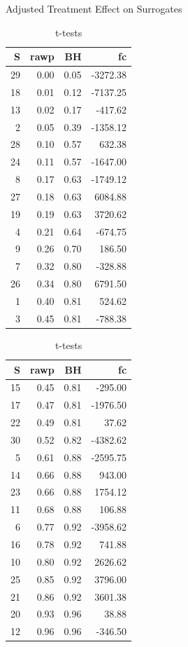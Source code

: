\documentclass[a4paper,9pt]{beamer}\usepackage[]{graphicx}\usepackage[]{color}
\begin{document}
\begin{frame}{Adjusted Treatment Effect on Surrogates}
\begin{table}[H]
\begin{minipage}{0.5\textwidth}
\centering
\begin{tabular}{rrrr}
  \hline
S & rawp & BH & fc \\ 
  \hline
  29 & 0.00 & 0.05 & -3272.38 \\ 
  18 & 0.01 & 0.12 & -7137.25 \\ 
  13 & 0.02 & 0.17 & -417.62 \\ 
  2 & 0.05 & 0.39 & -1358.12 \\ 
  28 & 0.10 & 0.57 & 632.38 \\ 
  24 & 0.11 & 0.57 & -1647.00 \\ 
  8 & 0.17 & 0.63 & -1749.12 \\ 
  27 & 0.18 & 0.63 & 6084.88 \\ 
  19 & 0.19 & 0.63 & 3720.62 \\ 
  4 & 0.21 & 0.64 & -674.75 \\ 
  9 & 0.26 & 0.70 & 186.50 \\ 
  7 & 0.32 & 0.80 & -328.88 \\ 
  26 & 0.34 & 0.80 & 6791.50 \\ 
  1 & 0.40 & 0.81 & 524.62 \\ 
  3 & 0.45 & 0.81 & -788.38 \\ 
  \hline
  \end{tabular}
\end{minipage}\hfill
\begin{minipage}{0.4\textwidth}
\begin{tabular}{rrrr}
\hline
S & rawp & BH & fc \\ 
  \hline
  15 & 0.45 & 0.81 & -295.00 \\ 
  17 & 0.47 & 0.81 & -1976.50 \\ 
  22 & 0.49 & 0.81 & 37.62 \\ 
  30 & 0.52 & 0.82 & -4382.62 \\
  5 & 0.61 & 0.88 & -2595.75 \\ 
  14 & 0.66 & 0.88 & 943.00 \\ 
  23 & 0.66 & 0.88 & 1754.12 \\ 
  11 & 0.68 & 0.88 & 106.88 \\ 
  6 & 0.77 & 0.92 & -3958.62 \\ 
  16 & 0.78 & 0.92 & 741.88 \\ 
  10 & 0.80 & 0.92 & 2626.62 \\ 
  25 & 0.85 & 0.92 & 3796.00 \\ 
  21 & 0.86 & 0.92 & 3601.38 \\ 
  20 & 0.93 & 0.96 & 38.88 \\ 
  12 & 0.96 & 0.96 & -346.50 \\ 
   \hline
\end{tabular}
\end{minipage}
\caption{t-tests}
\end{table}

\end{frame}
\end{document}
